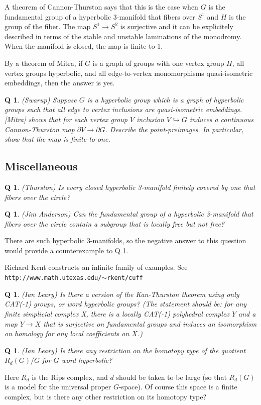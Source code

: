 \documentclass[11pt]{article}
\newtheorem{q}[thm]{Q}
\theoremstyle{remark}
\def\b{\begin{q}}
\def\e{\end{q}}
\newcommand{\<}{\langle}
\renewcommand{\>}{\rangle}
\begin{document}
A theorem of Cannon-Thurston says that this is the case when $G$ is the
fundamental group of a hyperbolic 3-manifold that fibers over $S^1$ and $H$ is
the group of the fiber. The map $S^1\to S^2$ is surjective and it can be
explicitely described in terms of the stable and unstable laminations of the
monodromy. When the manifold is closed, the map is finite-to-1.

By a theorem of Mitra, if $G$ is a graph of groups with one vertex group $H$,
all vertex groups hyperbolic, and all edge-to-vertex monomorphisms
quasi-isometric embeddings, then the answer is yes.

\b
(Swarup) Suppose $G$ is a hyperbolic group which is a graph of
hyperbolic groups such that all edge to vertex inclusions are
quasi-isometric embeddings.  [Mitra] shows that for each vertex group
$V$ inclusion $V\hookrightarrow G$ induces a continuous
Cannon-Thurston map $\partial V\to \partial G$.  Describe the
point-preimages. In particular, show that the map is finite-to-one.
\e



\subsection{Miscellaneous}

\b \label{thurston}
(Thurston) Is every closed hyperbolic 3-manifold finitely covered
by one that fibers over the circle?\e

\b
(Jim Anderson) Can the fundamental group of a hyperbolic 3-manifold
that fibers over the circle contain a subgroup that is locally free but
not free? \e
There are such hyperbolic 3-manifolds, so the negative answer
to this question would provide a counterexample to Q \ref{thurston}.

Richard Kent constructs an infinite family of examples. See\newline
{\tt http://www.math.utexas.edu/$\sim$rkent/cuff}

\b (Ian Leary)
Is there a version of the Kan-Thurston theorem using only 
CAT(-1) groups, or word hyperbolic groups?  (The statement 
should be:  for any finite simplicial complex X, there is a
locally CAT(-1) polyhedral complex $Y$ and a map $Y \to X$ 
that is surjective on fundamental groups and induces an 
isomorphism on homology for any local coefficients on $X$.)  
\e

\b (Ian Leary)
Is there any restriction on the homotopy type of the 
quotient $R_d(G)/G$ for $G$ word hyperbolic?  
\e
Here $R_d$ is 
the Rips complex, and $d$ should be taken to be large 
(so that $R_d(G)$ is a model for the universal proper $G$-space).  
     Of course this space is a finite complex, but is there any 
other restriction on its homotopy type?   
\end{document}
